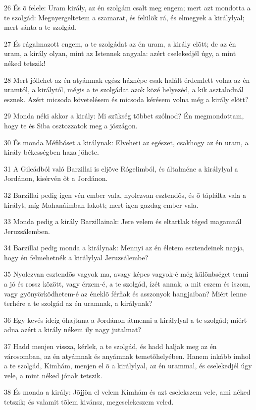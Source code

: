 \par 26 És õ felele: Uram király, az én szolgám csalt meg engem; mert azt mondotta a te szolgád: Megnyergeltetem a szamarat, és felülök rá, és elmegyek a királylyal; mert sánta a te szolgád.
\par 27 És rágalmazott engem, a te szolgádat az én uram, a király elõtt; de az én uram, a király olyan,  mint az Istennek angyala: azért cselekedjél úgy, a mint néked tetszik!
\par 28 Mert jóllehet az én atyámnak egész háznépe csak halált érdemlett volna az én uramtól, a királytól, mégis a te szolgádat azok közé helyezéd, a kik asztalodnál esznek. Azért micsoda követelésem és micsoda kérésem volna még a király elõtt?
\par 29 Monda néki akkor a király: Mi szükség többet szólnod? Én megmondottam, hogy te és Siba osztozzatok meg a jószágon.
\par 30 És monda Méfibóset a királynak: Elveheti az egészet, csakhogy az én uram, a király békességben haza jöhete.
\par 31 A Gileádból való Barzillai is eljöve Rógelimból, és általméne a királylyal a Jordánon, kisérvén õt a Jordánon.
\par 32 Barzillai pedig igen vén ember vala, nyolczvan esztendõs, és õ táplálta vala a királyt, míg Mahanáimban lakott; mert igen gazdag ember vala.
\par 33 Monda pedig a király Barzillainak: Jere velem és eltartlak téged magamnál Jeruzsálemben.
\par 34 Barzillai pedig monda a királynak: Mennyi az én életem esztendeinek napja, hogy én felmehetnék a királylyal Jeruzsálembe?
\par 35 Nyolczvan esztendõs vagyok ma, avagy képes vagyok-é még különbséget tenni a jó és rossz között, vagy érzem-é, a te szolgád, ízét annak, a mit eszem és iszom, vagy gyönyörködhetem-é az éneklõ férfiak és asszonyok hangjaiban? Miért lenne terhére a te szolgád az én uramnak, a királynak?
\par 36 Egy kevés ideig óhajtana a Jordánon átmenni a királylyal a te szolgád; miért adna azért a király nékem ily nagy jutalmat?
\par 37 Hadd menjen vissza, kérlek, a te szolgád, és hadd haljak meg az én városomban, az én atyámnak és anyámnak temetõhelyében. Hanem inkább ímhol a te szolgád, Kimhám, menjen el õ a királylyal, az én urammal, és cselekedjél úgy vele, a mint néked jónak tetszik.
\par 38 És monda a király: Jõjjön el velem Kimhám és azt cselekszem vele, ami néked tetszik; és valamit tõlem kivánsz, megcselekeszem veled.
